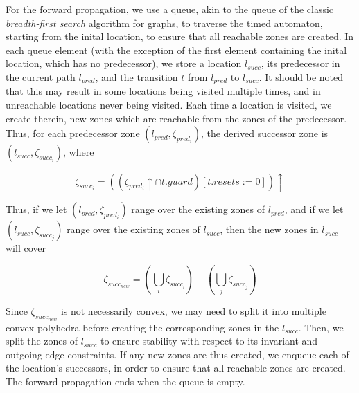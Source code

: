 \documentclass[a4paper]{llncs}
\begin{document}
For the forward propagation, we use a queue,
akin to the queue of the classic \emph{breadth-first search} algorithm
for graphs, to traverse the timed automaton, starting from the inital
location, to ensure that all reachable zones are created. In each
queue element (with the exception of the first element containing the
inital location, which has no predecessor), we store a location
$l_{succ}$, its predecessor in the current path $l_{pred}$, and the
transition $t$ from $l_{pred}$ to $l_{succ}$. It should be noted
that this may result in some locations being visited multiple times,
and in unreachable locations never being visited. Each time a location
is visited, we create therein, new zones which are reachable from the
zones of the predecessor. \\
Thus, for each predecessor zone $(l_{pred}, \zeta _{pred_{i}})$, the
derived successor zone is $(l_{succ}, \zeta _{succ_{i}})$, where

\begin{displaymath} 
  \zeta _{succ_{i}} = ((\zeta _{pred_{i}} \uparrow \cap t.guard)[t.resets := 0]) \uparrow
\end{displaymath} 

Thus, if we let  $(l_{pred}, \zeta _{pred_{i}})$ range over the
existing zones of $l_{pred}$, and if we let  $(l_{succ}, \zeta
_{succ_{j}})$ range over the existing zones of $l_{succ}$, then the
new zones in $l_{succ}$ will cover

\begin{displaymath} 
  \zeta _{succ_{new}} = (\bigcup _{i} \zeta_{succ_{i}}) - (\bigcup _{j} \zeta_{succ_{j}})
\end{displaymath} 

Since $\zeta _{succ_{new}}$ is not necessarily convex, we may need to
split it into multiple convex polyhedra before creating the
corresponding zones in the $l_{succ}$. Then, we split the zones of
$l_{succ}$ to ensure stability with respect to
its invariant and outgoing edge constraints. If any new
zones are thus created, we enqueue each of the location's successors,
in order to ensure that all reachable zones are created. The forward
propagation ends when the queue is empty. \\
\end{document}
